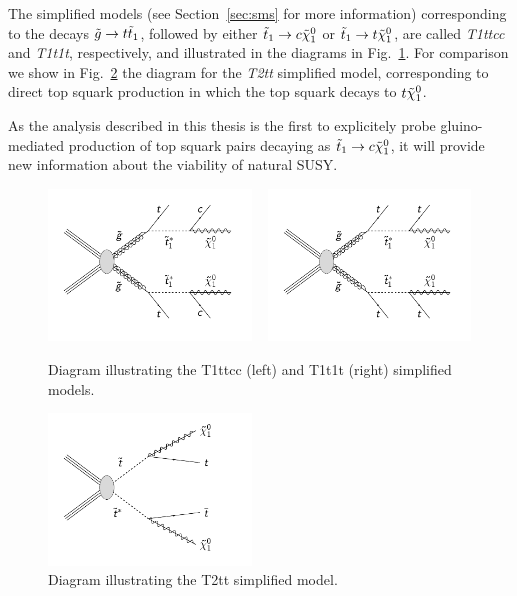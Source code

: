 The simplified models (see Section~\ref{sec:sms} for more information) corresponding to the
decays $\tilde{g} \rightarrow t \tilde{t}_1$, followed by either $\tilde{t}_1 \rightarrow c \tilde{\chi}_1^0$ or
$\tilde{t}_1 \rightarrow t \tilde{\chi}_1^0$, are called \textit{T1ttcc} and \textit{T1t1t}, respectively, and
illustrated in the diagrams in Fig.~\ref{fig:T1ttcc_T1t1t_diagrams}. For comparison we show in
Fig.~\ref{fig:T2tt_diagram} the diagram for the \textit{T2tt} simplified model, corresponding to
direct top squark production in which the top squark decays to $t \tilde{\chi}_1^0$. 

As the analysis described in this thesis is the first to explicitely probe gluino-mediated
production of top squark pairs decaying as $\tilde{t}_1 \rightarrow c \tilde{\chi}_1^0$, it will provide new
information about the viability of natural SUSY. 

\begin{figure}
  \centering
  \includegraphics[width=0.48\textwidth]{figures/razor_interpretation/T1ttcc}
  ~
  \includegraphics[width=0.48\textwidth]{figures/razor_interpretation/T1t1t}
  \caption{Diagram illustrating the T1ttcc (left) and T1t1t (right) simplified models.
  \label{fig:T1ttcc_T1t1t_diagrams}}
\end{figure}

\begin{figure}
  \centering
  \includegraphics[width=0.48\textwidth]{figures/razor_motivation/T2tt}
  \caption{Diagram illustrating the T2tt simplified model.
  \label{fig:T2tt_diagram}}
\end{figure}

